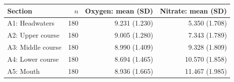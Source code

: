 \begin{tabular}{lrrr}
\toprule
Section & $n$ & Oxygen: mean (SD) & Nitrate: mean (SD) \\
\midrule
A1: Headwaters & 180 & 9.231 (1.230) & 5.350 (1.708) \\
A2: Upper course & 180 & 9.005 (1.280) & 7.343 (1.789) \\
A3: Middle course & 180 & 8.990 (1.409) & 9.328 (1.809) \\
A4: Lower course & 180 & 8.694 (1.465) & 10.570 (1.858) \\
A5: Mouth & 180 & 8.936 (1.665) & 11.467 (1.985) \\
\bottomrule
\end{tabular}
